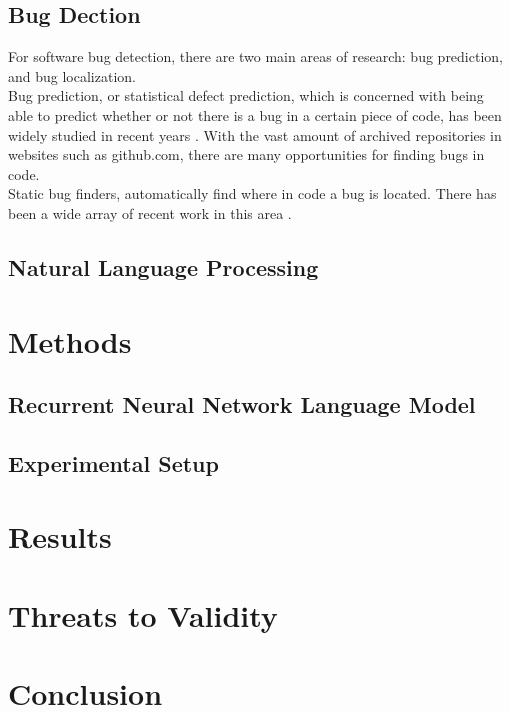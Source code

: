 \documentclass{article}
\begin{document}
\subsection{Bug Dection}
For software bug detection, there are two main areas of research: bug prediction, and bug localization. \\
Bug prediction, or statistical defect prediction, which is concerned with being able to predict whether or not there is a bug in a certain piece of code, has been widely studied in recent years \citep{atal2009systematic}. With the vast amount of archived repositories in websites such as github.com, there are many opportunities for finding bugs in code.\\
Static bug finders, automatically find where in code a bug is located. There has been a wide array of recent work in this area \citep{rahman2014comparing}.

\subsection{Natural Language Processing}


\section{Methods}

\subsection{Recurrent Neural Network Language Model}

\subsection{Experimental Setup}


\section{Results}


\section{Threats to Validity}

\section{Conclusion}







\end{document}
